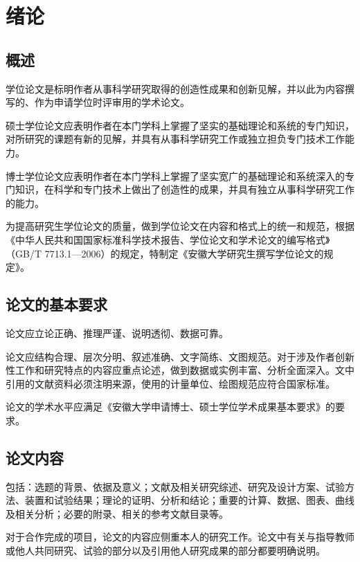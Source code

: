 \chapter{绪论}

\section{概述}
学位论文是标明作者从事科学研究取得的创造性成果和创新见解，并以此为内容撰写的、作为申请学位时评审用的学术论文。

硕士学位论文应表明作者在本门学科上掌握了坚实的基础理论和系统的专门知识，对所研究的课题有新的见解，并具有从事科学研究工作或独立担负专门技术工作能力。

博士学位论文应表明作者在本门学科上掌握了坚实宽广的基础理论和系统深入的专门知识，在科学和专门技术上做出了创造性的成果，并具有独立从事科学研究工作的能力。

为提高研究生学位论文的质量，做到学位论文在内容和格式上的统一和规范，根据《中华人民共和国国家标准科学技术报告、学位论文和学术论文的编写格式》（GB/T 7713.1—2006）的规定，特制定《安徽大学研究生撰写学位论文的规定》。

\section{论文的基本要求}
论文应立论正确、推理严谨、说明透彻、数据可靠。

论文应结构合理、层次分明、叙述准确、文字简练、文图规范。对于涉及作者创新性工作和研究特点的内容应重点论述，做到数据或实例丰富、分析全面深入。文中引用的文献资料必须注明来源，使用的计量单位、绘图规范应符合国家标准。

论文的学术水平应满足《安徽大学申请博士、硕士学位学术成果基本要求》的要求。

\section{论文内容}
包括：选题的背景、依据及意义；文献及相关研究综述、研究及设计方案、试验方法、装置和试验结果；理论的证明、分析和结论；重要的计算、数据、图表、曲线及相关分析；必要的附录、相关的参考文献目录等。

对于合作完成的项目，论文的内容应侧重本人的研究工作。论文中有关与指导教师或他人共同研究、试验的部分以及引用他人研究成果的部分都要明确说明。

